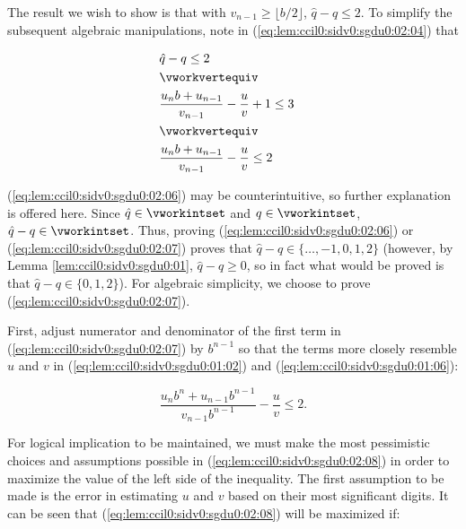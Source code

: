 \begin{vworklemmaproof}
The result we wish to show is that with $v_{n-1} \geq \lfloor b/2 \rfloor$,
$\hat{q}-q \leq 2$.  To simplify the subsequent algebraic manipulations, note in 
(\ref{eq:lem:ccil0:sidv0:sgdu0:02:04}) that

\begin{eqnarray}
\label{eq:lem:ccil0:sidv0:sgdu0:02:05}
          & \hat{q} - q  \leq 2 &  \\    
\nonumber & \vworkvertequiv     &  \\
\label{eq:lem:ccil0:sidv0:sgdu0:02:06}
          & \displaystyle \frac{u_n b + u_{n-1}}{v_{n-1}}
                - \frac{u}{v}
                + 1 \leq 3 &          \\
\nonumber & \vworkvertequiv     &  \\
\label{eq:lem:ccil0:sidv0:sgdu0:02:07}
          & \displaystyle \frac{u_n b + u_{n-1}}{v_{n-1}}
                - \frac{u}{v} \leq 2    &
\end{eqnarray}

(\ref{eq:lem:ccil0:sidv0:sgdu0:02:06}) may be counterintuitive, so
further explanation is offered here.  Since $\hat{q} \in \vworkintset$ and $q \in \vworkintset$,
$\hat{q}-q \in \vworkintset$.  Thus, proving 
(\ref{eq:lem:ccil0:sidv0:sgdu0:02:06}) or
(\ref{eq:lem:ccil0:sidv0:sgdu0:02:07}) proves that
$\hat{q}-q \in \{ \ldots, -1, 0, 1, 2 \}$ (however, by 
Lemma \ref{lem:ccil0:sidv0:sgdu0:01}, $\hat{q}-q \geq 0$, so in fact
what would be proved is that $\hat{q}-q \in \{ 0, 1, 2 \}$).  For 
algebraic simplicity,
we choose to prove (\ref{eq:lem:ccil0:sidv0:sgdu0:02:07}).

First, adjust numerator and denominator of the first term in 
(\ref{eq:lem:ccil0:sidv0:sgdu0:02:07}) by $b^{n-1}$ so that the terms more closely 
resemble $u$ and $v$ in 
(\ref{eq:lem:ccil0:sidv0:sgdu0:01:02}) 
and 
(\ref{eq:lem:ccil0:sidv0:sgdu0:01:06}):

\begin{equation}
\label{eq:lem:ccil0:sidv0:sgdu0:02:08}
\frac{u_n b^n + u_{n-1} b^{n-1}}{v_{n-1} b^{n-1}}
                - \frac{u}{v} \leq 2 .
\end{equation}

For logical implication to be maintained,
we must make the most pessimistic choices and assumptions possible in 
(\ref{eq:lem:ccil0:sidv0:sgdu0:02:08}) in order to maximize the value
of the left side of the inequality.
The first assumption to be made is the error in estimating
$u$ and $v$ based on their most significant digits.  It can be
seen that (\ref{eq:lem:ccil0:sidv0:sgdu0:02:08}) will be maximized if:


\end{vworklemmaproof}
